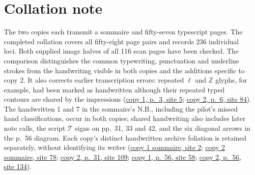 \section*{Collation note}
The two copies each transmit a sommaire and fifty-seven typescript pages.
The completed collation covers all fifty-eight page pairs and records 236
individual loci. Both supplied image halves of all 116 scan pages have been
checked. The comparison
distinguishes the common typewriting, punctuation and underline strokes from
the handwriting visible in both copies and the additions specific to copy 2.
It also corrects earlier transcription errors: repeated $\ell$ and $\mathbb{Z}$
glyphs, for example, had been marked as handwritten although their repeated
typed contours are shared by the impressions
(\href{https://grothendieck.umontpellier.fr/web/viewer.html?file=../119.pdf\#page=6}{copy 1, p.~3, site 5};
\href{https://grothendieck.umontpellier.fr/web/viewer.html?file=../119.pdf\#page=85}{copy 2, p.~6, site 84}).
The handwritten 1 and 7 in the sommaire's N.B., including the pilot's missed
hand classifications, occur in both copies; shared handwriting also includes
later note calls, the script $\mathcal{T}$ signs on pp.~31, 33 and 42, and the
six diagonal arrows in the p.~56 diagram.
Each copy's distinct handwritten archive foliation is retained separately,
without identifying its writer
(\href{https://grothendieck.umontpellier.fr/web/viewer.html?file=../119.pdf\#page=3}{copy 1 sommaire, site 2};
\href{https://grothendieck.umontpellier.fr/web/viewer.html?file=../119.pdf\#page=79}{copy 2 sommaire, site 78};
\href{https://grothendieck.umontpellier.fr/web/viewer.html?file=../119.pdf\#page=110}{copy 2, p.~31, site 109};
\href{https://grothendieck.umontpellier.fr/web/viewer.html?file=../119.pdf\#page=59}{copy 1, p.~56, site 58};
\href{https://grothendieck.umontpellier.fr/web/viewer.html?file=../119.pdf\#page=135}{copy 2, p.~56, site 134}).

